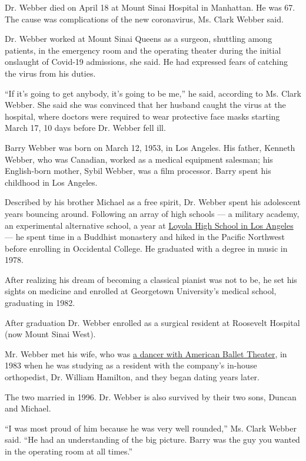 Dr. Webber died on April 18 at Mount Sinai Hospital in Manhattan. He was
67. The cause was complications of the new coronavirus, Ms. Clark Webber
said.

Dr. Webber worked at Mount Sinai Queens as a surgeon, shuttling among
patients, in the emergency room and the operating theater during the
initial onslaught of Covid-19 admissions, she said. He had expressed
fears of catching the virus from his duties.

``If it's going to get anybody, it's going to be me,'' he said,
according to Ms. Clark Webber. She said she was convinced that her
husband caught the virus at the hospital, where doctors were required to
wear protective face masks starting March 17, 10 days before Dr. Webber
fell ill.

Barry Webber was born on March 12, 1953, in Los Angeles. His father,
Kenneth Webber, who was Canadian, worked as a medical equipment
salesman; his English-born mother, Sybil Webber, was a film processor.
Barry spent his childhood in Los Angeles.

Described by his brother Michael as a free spirit, Dr. Webber spent his
adolescent years bouncing around. Following an array of high schools ---
a military academy, an experimental alternative school, a year at
\href{https://www.loyolahs.edu/}{Loyola High School in Los Angeles} ---
he spent time in a Buddhist monastery and hiked in the Pacific Northwest
before enrolling in Occidental College. He graduated with a degree in
music in 1978.

After realizing his dream of becoming a classical pianist was not to be,
he set his sights on medicine and enrolled at Georgetown University's
medical school, graduating in 1982.

After graduation Dr. Webber enrolled as a surgical resident at Roosevelt
Hospital (now Mount Sinai West).

Mr. Webber met his wife, who was
\href{https://www.abt.org/people/harriet-clark/}{a dancer with American
Ballet Theater}, in 1983 when he was studying as a resident with the
company's in-house orthopedist, Dr. William Hamilton, and they began
dating years later.

The two married in 1996. Dr. Webber is also survived by their two sons,
Duncan and Michael.

``I was most proud of him because he was very well rounded,'' Ms. Clark
Webber said. ``He had an understanding of the big picture. Barry was the
guy you wanted in the operating room at all times.''

